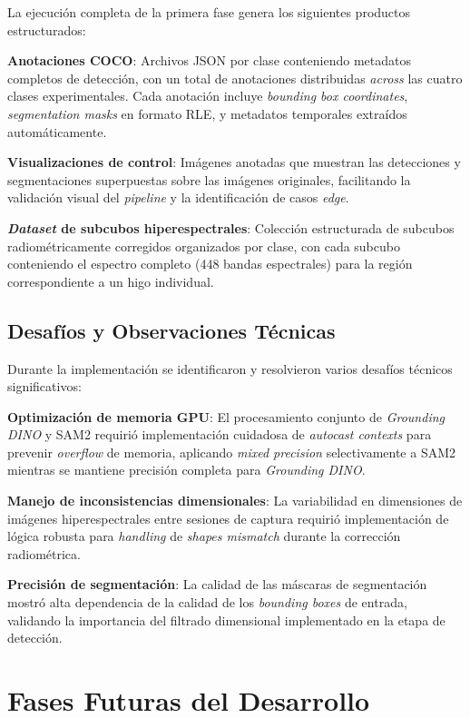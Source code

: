 La ejecución completa de la primera fase genera los siguientes productos estructurados:

\textbf{Anotaciones COCO}: Archivos JSON por clase conteniendo metadatos completos de detección, con un total de anotaciones distribuidas \emph{across} las cuatro clases experimentales. Cada anotación incluye \emph{bounding box coordinates}, \emph{segmentation masks} en formato RLE, y metadatos temporales extraídos automáticamente.


\textbf{Visualizaciones de control}: Imágenes anotadas que muestran las detecciones y segmentaciones superpuestas sobre las imágenes originales, facilitando la validación visual del \emph{pipeline} y la identificación de casos \emph{edge}.

\textbf{\emph{Dataset} de subcubos hiperespectrales}: Colección estructurada de subcubos radiométricamente corregidos organizados por clase, con cada subcubo conteniendo el espectro completo (448 bandas espectrales) para la región correspondiente a un higo individual.

\subsection{Desafíos y Observaciones Técnicas}

Durante la implementación se identificaron y resolvieron varios desafíos técnicos significativos:

\textbf{Optimización de memoria GPU}: El procesamiento conjunto de \emph{Grounding DINO} y SAM2 requirió implementación cuidadosa de \emph{autocast contexts} para prevenir \emph{overflow} de memoria, aplicando \emph{mixed precision} selectivamente a SAM2 mientras se mantiene precisión completa para \emph{Grounding DINO}.

\textbf{Manejo de inconsistencias dimensionales}: La variabilidad en dimensiones de imágenes hiperespectrales entre sesiones de captura requirió implementación de lógica robusta para \emph{handling} de \emph{shapes mismatch} durante la corrección radiométrica.

\textbf{Precisión de segmentación}: La calidad de las máscaras de segmentación mostró alta dependencia de la calidad de los \emph{bounding boxes} de entrada, validando la importancia del filtrado dimensional implementado en la etapa de detección.

\section{Fases Futuras del Desarrollo}

